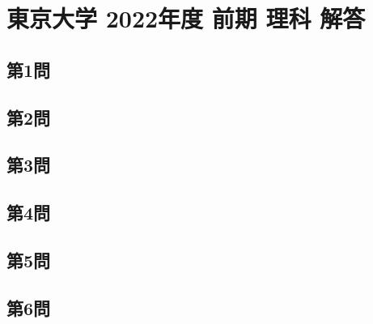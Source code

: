 ﻿\documentclass[../../uem_tok_a.tex]{subfiles}
\begin{document}
    \section{東京大学 2022年度 前期 理科 解答}

    \subsection{第1問}
    

    \clearpage
    \subsection{第2問}
    

    \clearpage
    \subsection{第3問}
    

    \clearpage
    \subsection{第4問}
    

    \clearpage
    \subsection{第5問}
    

    \clearpage
    \subsection{第6問}
    

    \clearpage
\end{document}
